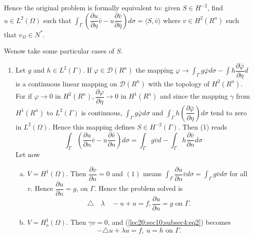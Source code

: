 Hence the original problem is formally equivalent to: given $S
\in H^{-2}$, find $u \in L^2 (\Omega)$ such that
$\int_\Gamma \left(\dfrac{\partial u}{\partial \eta} \bar{v} - u
\dfrac{\partial \bar{v}}{\partial \bar{\eta}} \right) d \sigma = \langle S,
\bar{v} \rangle$ where $v \in H^2(R^n)$ such that $v_\Omega
\in N^*$.  

We\pageoriginale now take some particular cases of $S$. 
\begin{enumerate}[1)]
\item Let $g$ and $h \in L^2 (\Gamma )$. If $\varphi
  \in \mathscr{D} (R^n)$ the mapping $\varphi \to \int_\Gamma
  g \bar{\varphi}d \sigma - \int h \dfrac{\partial
    \bar{\varphi}}{\partial \eta}d$ is a continuous linear mapping on
  $\mathscr{D} (R^n)$ with the topology of $H^2 (R^n)$. For if
  $\varphi \to 0$ in $H^2 (R^n), \dfrac{\partial \varphi}{\partial
    \eta} \to 0$ in $H^1 (R^n)$ and since the mapping $\gamma$ from
  $H^1 (R^n)$ to $L^2 (\Gamma )$ is continuous, $\int_\Gamma g
  \bar{\varphi} d \sigma$ and $\int_\Gamma h(\dfrac{\partial
    \bar{\varphi}}{\partial \eta}) d \sigma$ tend to zero in $L^2
  (\Omega)$. Hence this mapping defines $S \in H^{-2}
  (\Gamma)$. Then (1) reads 
  \begin{equation*}
    \int_\Gamma \left(\frac{\partial u}{\partial n} \bar{v } - u \frac{\partial
      \bar{v}}{\partial n}\right) d \sigma = \int_\Gamma g \bar{v}d - \int_\Gamma
    h \frac{\partial \bar{v}}{\partial n} d \sigma \tag{2}\label{lec20:sec10:subsec4:eq2} 
  \end{equation*}
  Let now
  \begin{enumerate}[a)]
  \item $V = H^1 (\Omega)$. Then $\dfrac{\partial v}{\partial n}= 0$ and
    $(1)$ means $\int_\Gamma \dfrac{\partial u }{\partial n} \bar{v} d
    \sigma = \int_\Gamma g \bar{v} d \sigma$ for all $v$. Hence
    $\dfrac{\partial u}{\partial n} = g$, on $\Gamma$. Hence the problem
    solved is  
    \begin{equation*}
      \triangle \quad \lambda \quad - u + u = f, \frac{\partial u}{\partial
        n } = g \text { on } \Gamma. \tag{3}\label{lec20:sec10:subsec4:eq3} 
    \end{equation*}
  \item $V = H^1_o (\Omega)$. Then $\gamma v = 0$, and (\ref{lec20:sec10:subsec4:eq2}) becomes
    \begin{equation*}
      - \triangle u + \lambda u = f, ~ u = h \text { on } \Gamma. \tag{4}\label{lec20:sec10:subsec4:eq4}
    \end{equation*}

\end{enumerate}
\end{enumerate}
